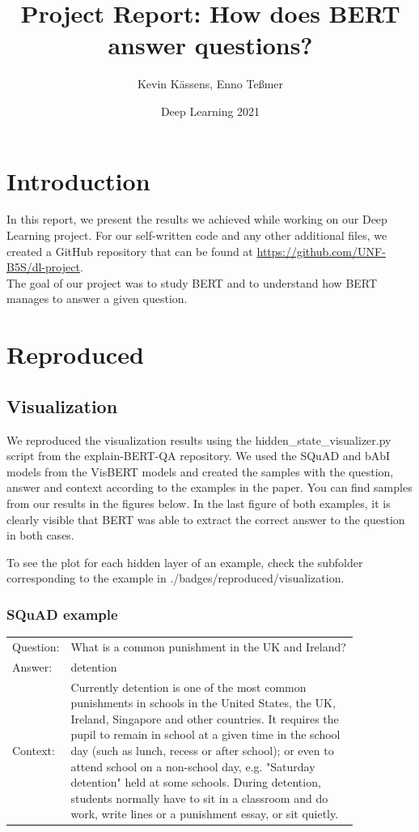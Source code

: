 \documentclass{article}
\title{Project Report: How does BERT answer questions?}
\author{Kevin Kässens, Enno Teßmer}
\date{Deep Learning 2021}
\begin{document}
	\maketitle
	\section{Introduction}
	In this report, we present the results we achieved while working on our Deep Learning project. For our self-written code and any other additional files, we created a GitHub repository that can be found at \url{https://github.com/UNF-B5S/dl-project}.\\
	
	The goal of our project was to study BERT and to understand how BERT manages to answer a given question. 
	
	\section{Reproduced}
	\subsection{Visualization}
	We reproduced the visualization results using the hidden\_state\_visualizer.py script from the explain-BERT-QA repository. We used the SQuAD and bAbI models from the VisBERT models and created the samples with the question, answer and context according to the examples in the paper.
	You can find samples from our results in the figures below. In the last figure of both examples, it is clearly visible that BERT was able to extract the correct answer to the question in both cases.
	
	To see the plot for each hidden layer of an example, check the subfolder corresponding to the example in ./badges/reproduced/visualization.
	
	\subsubsection{SQuAD example}
	
	\begin{tabular}{ l p{0.85\linewidth} }
		Question: & What is a common punishment in the UK and Ireland? \\
		Answer: & detention \\
		Context: & Currently detention is one of the most common punishments in schools in the United States, the UK, Ireland, Singapore and other countries. It requires the pupil to remain in school at a given time in the school day (such as lunch, recess or after school); or even to attend school on a non-school day, e.g. "Saturday detention" held at some schools. During detention, students normally have to sit in a classroom and do work, write lines or a punishment essay, or sit quietly. \\
	\end{tabular}
	
\end{document}
